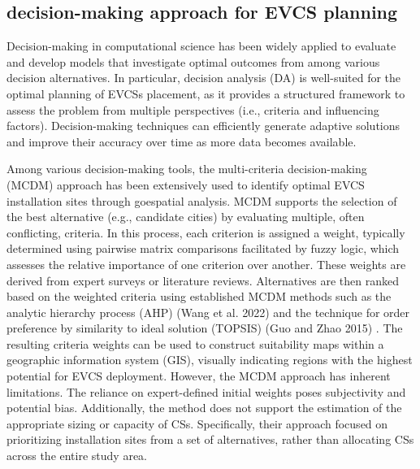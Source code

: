 \documentclass[preprint,12pt]{elsarticle}
\begin{document}
\vspace{0.5cm}

\subsection{decision-making approach for EVCS planning}
Decision-making in computational science has been widely applied to evaluate and develop models that investigate optimal outcomes from among various decision alternatives. In particular, decision analysis (DA) is well-suited for the optimal planning of EVCSs placement, as it provides a structured framework to assess the problem from multiple perspectives (i.e., criteria and influencing factors). Decision-making techniques can efficiently generate adaptive solutions and improve their accuracy over time as more data becomes available.

\vspace{0.5cm}

Among various decision-making tools, the multi-criteria decision-making (MCDM) approach has been extensively used to identify optimal EVCS installation sites through goespatial analysis. MCDM supports the selection of the best alternative (e.g., candidate cities) by evaluating multiple, often conflicting, criteria. In this process, each criterion is assigned a weight, typically determined using pairwise matrix comparisons facilitated by fuzzy logic, which assesses the relative importance of one criterion over another. These weights are derived from expert surveys or literature reviews. Alternatives are then ranked based on the weighted criteria using established MCDM methods such as the analytic hierarchy process (AHP) (Wang et al. 2022) \cite{Wang_Tao2022} and the technique for order preference by similarity to ideal solution (TOPSIS) (Guo and Zhao 2015) \cite{Guo_zhao2015}. The resulting criteria weights can be used to construct suitability maps within a geographic information system (GIS), visually indicating regions with the highest potential for EVCS deployment. However, the MCDM approach has inherent limitations. The reliance on expert-defined initial weights poses subjectivity and potential bias. Additionally, the method does not support the estimation of the appropriate sizing or capacity of CSs. Specifically, their approach focused on prioritizing installation sites from a set of alternatives, rather than allocating CSs across the entire study area. 

\vspace{0.5cm}
\end{document}
